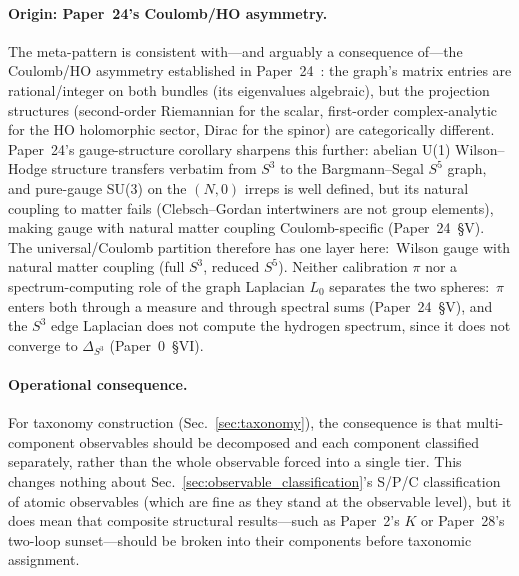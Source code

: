 \documentclass[aps,pra,twocolumn,superscriptaddress,longbibliography]{revtex4-2}
\begin{document}
\paragraph{Origin: Paper~24's Coulomb/HO asymmetry.}
The meta-pattern is consistent with---and arguably a consequence
of---the Coulomb/HO asymmetry established in
Paper~24~\cite{loutey_paper24}: the graph's matrix entries are
rational/integer on both bundles (its eigenvalues algebraic), but the projection structures (second-order Riemannian
for the scalar, first-order complex-analytic for the HO holomorphic
sector, Dirac for the spinor) are categorically different.  Paper~24's gauge-structure corollary sharpens this further:
abelian U(1) Wilson--Hodge structure transfers verbatim from $S^3$
to the Bargmann--Segal $S^5$ graph, and pure-gauge SU(3) on the $(N,0)$
irreps is well defined, but its natural coupling to matter fails
(Clebsch--Gordan intertwiners are not group elements), making gauge
with natural matter coupling Coulomb-specific (Paper~24~\S V).  The
universal/Coulomb partition therefore has one layer here:\ Wilson
gauge with natural matter coupling (full $S^3$, reduced $S^5$).  Neither calibration
$\pi$ nor a spectrum-computing role of the graph Laplacian $L_0$
separates the two spheres:\ $\pi$ enters both through a measure and
through spectral sums (Paper~24~\S V), and the $S^3$ edge Laplacian
does not compute the hydrogen spectrum, since it does not converge to
$\Delta_{S^3}$ (Paper~0~\S VI).

\paragraph{Operational consequence.}  For taxonomy construction
(Sec.~\ref{sec:taxonomy}), the consequence is that multi-component
observables should be decomposed and each component classified
separately, rather than the whole observable forced into a single
tier.  This changes nothing about
Sec.~\ref{sec:observable_classification}'s S/P/C classification of
atomic observables (which are fine as they stand at the observable
level), but it does mean that composite structural results---such as
Paper~2's $K$ or Paper~28's two-loop sunset---should be broken into
their components before taxonomic assignment.


\end{document}

